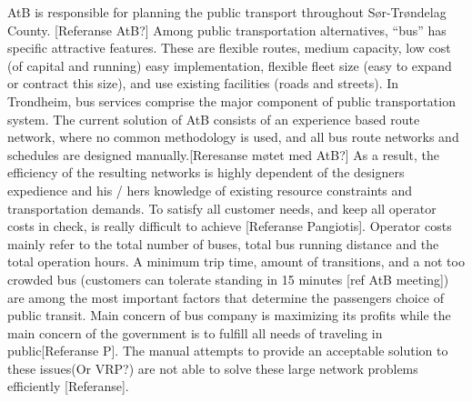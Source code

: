 AtB is responsible for planning the public transport throughout Sør-Trøndelag County. [Referanse AtB?] Among public transportation alternatives, “bus” has specific attractive features. These are flexible routes, medium capacity, low cost (of capital and running) easy implementation, flexible fleet size (easy to expand or contract this size), and use existing facilities (roads and streets). In Trondheim, bus services comprise the major component of public transportation system. The current solution of AtB consists of an experience based route network, where no common methodology is used, and all bus route networks and schedules are designed manually.[Reresanse møtet med AtB?] As a result, the efficiency of the resulting networks is highly dependent of the designers expedience and his / hers knowledge of existing resource constraints and transportation demands. To satisfy all customer needs, and keep all operator costs in check, is really difficult to achieve [Referanse Pangiotis]. Operator costs mainly refer to the total number of buses, total bus running distance and the total operation hours. A minimum trip time, amount of transitions, and a not too crowded bus (customers can tolerate standing in 15 minutes [ref AtB meeting]) are among the most important factors that determine the passengers choice of public transit.  Main concern of bus company is maximizing its profits while the main concern of the government is to fulfill all needs of traveling in public[Referanse P]. The manual attempts to provide an acceptable solution to these issues(Or VRP?) are not able to solve these large network problems efficiently [Referanse]. 


















